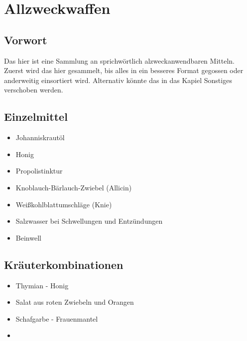 \chapter{Allzweckwaffen}


\section{Vorwort}

Das hier ist eine Sammlung an sprichwörtlich alzweckanwendbaren Mitteln. Zuerst wird das hier gesammelt, bis alles in ein besseres Format gegossen oder anderweitig einsortiert wird. Alternativ könnte das in das Kapiel Sonstiges verschoben werden.
\newpage


\section{Einzelmittel}

\begin{itemize}
	\item Johanniskrautöl
	\item Honig
	\item Propolistinktur
	\item Knoblauch-Bärlauch-Zwiebel (Allicin)
	\item Weißkohlblattumschläge (Knie)
	\item Salzwasser bei Schwellungen und Entzündungen
	\item Beinwell
\end{itemize}





\section{Kräuterkombinationen}

\begin{itemize}
	\item Thymian - Honig
	\item Salat aus roten Zwiebeln und Orangen
	\item Schafgarbe - Frauenmantel
	\item 
\end{itemize}